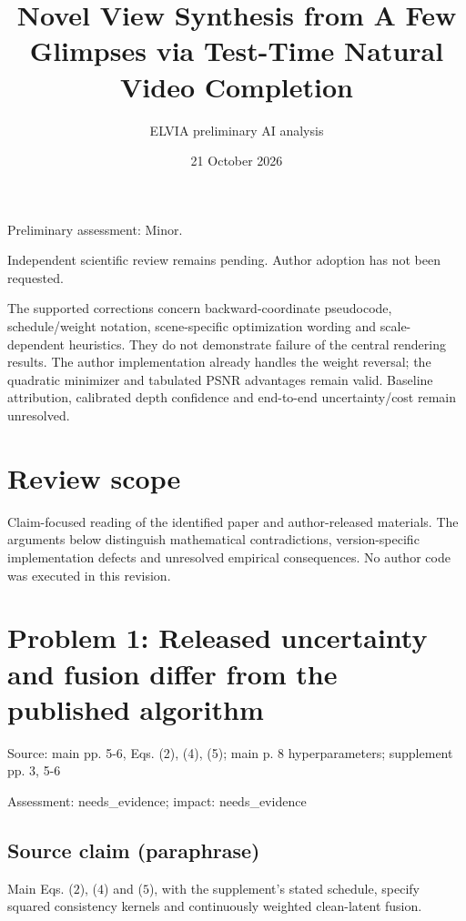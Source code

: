 \documentclass[11pt]{article}
\begin{document}
\title{Novel View Synthesis from A Few Glimpses via Test-Time Natural Video Completion}

\author{ELVIA preliminary AI analysis}\date{21 October 2026}\maketitle

Preliminary assessment: Minor.\par

Independent scientific review remains pending. Author adoption has not been requested.

The supported corrections concern backward-coordinate pseudocode, schedule/weight notation, scene-specific optimization wording and scale-dependent heuristics. They do not demonstrate failure of the central rendering results. The author implementation already handles the weight reversal; the quadratic minimizer and tabulated PSNR advantages remain valid. Baseline attribution, calibrated depth confidence and end-to-end uncertainty/cost remain unresolved.

\section*{Review scope}

Claim-focused reading of the identified paper and author-released materials. The arguments below distinguish mathematical contradictions, version-specific implementation defects and unresolved empirical consequences. No author code was executed in this revision.

\section*{Problem 1: Released uncertainty and fusion differ from the published algorithm}

Source: main pp. 5-6, Eqs. (2), (4), (5); main p. 8 hyperparameters; supplement pp. 3, 5-6

Assessment: needs\_evidence; impact: needs\_evidence

\subsection*{Source claim (paraphrase)}

Main Eqs. (\(2\)), (\(4\)) and (\(5\)), with the supplement's stated schedule, specify squared consistency kernels and continuously weighted clean-latent fusion.
\end{document}
